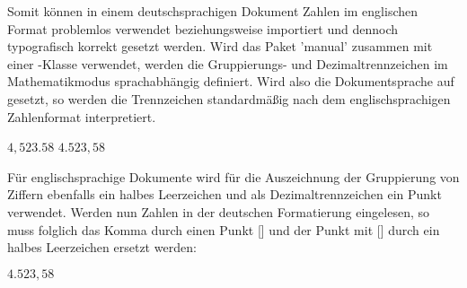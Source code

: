 \documentclass[english,ngerman]{tudscrartcl}
\begin{document}
\begin{Entity}{}
\begin{Trunk*}
\end{Trunk*}
%
Somit können in einem deutschsprachigen Dokument Zahlen im englischen Format 
problemlos verwendet beziehungsweise importiert und dennoch typografisch 
korrekt gesetzt werden.
%
%
Wird das Paket 'manual' zusammen mit einer \TUDScript-Klasse 
verwendet, werden die Gruppierungs- und Dezimaltrennzeichen im Mathematikmodus 
sprachabhängig definiert. Wird also die Dokumentsprache auf  
gesetzt, so werden die Trennzeichen standardmäßig nach dem englischsprachigen 
Zahlenformat interpretiert.
%
\begin{Trunk*}
\begingroup
  \(4,523.58\)\newline
  \(4.523,58\)
\endgroup

\end{Trunk*}
%
Für englischsprachige Dokumente wird für die Auszeichnung der Gruppierung von 
Ziffern ebenfalls ein halbes Leerzeichen und als Dezimaltrennzeichen ein Punkt 
verwendet. Werden nun Zahlen in der deutschen Formatierung eingelesen, so muss 
folglich das Komma durch einen Punkt [] und der 
Punkt mit [\MPValue{\Macro*{,}}] durch ein halbes Leerzeichen 
ersetzt werden:%
%
\begin{Trunk*}
\begingroup
  \dotswap{\,}
  \(4.523,58\)
\endgroup
\end{Trunk*}
%
\FinishTutorial
\ListOfToDo
\end{Entity}
\end{document}
